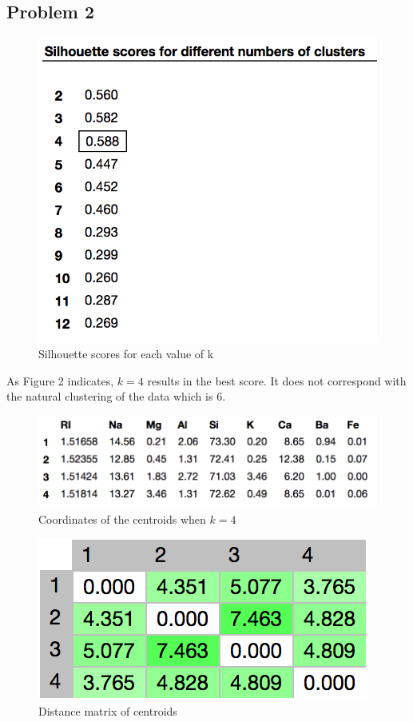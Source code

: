 \documentclass[12pt]{report}
\begin{document}
\subsection*{Problem 2}
\begin{figure}[H]
	\centering
	\includegraphics[width=0.6\linewidth]{p2silhouette.png}
	\caption{Silhouette scores for each value of k}
\end{figure}
As Figure 2 indicates, $k=4$ results in the best score. It does not correspond with the natural clustering of the data which is 6.
\begin{figure}[H]
	\centering
	\includegraphics[width=0.6\linewidth]{p2coordinates.png}
	\caption{Coordinates of the centroids when $k=4$}
\end{figure}
\begin{figure}[H]
	\centering
	\includegraphics[width=0.5\linewidth]{p2distances.png}
	\caption{Distance matrix of centroids}
\end{figure}
\end{document}
